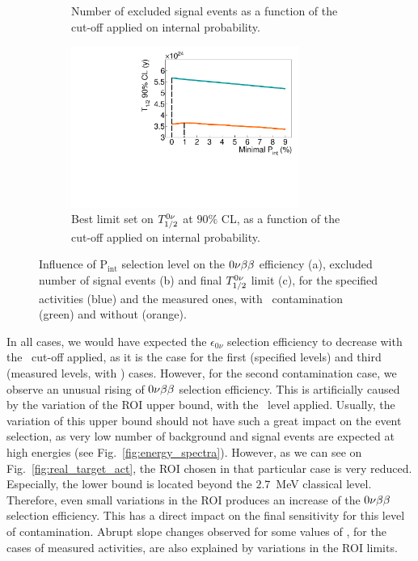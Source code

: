 \begin{figure}[!h]
\begin{subfigure}[t]{0.7\textwidth}
  \caption{Number of excluded signal events as a function of the cut-off applied on internal probability.
    \label{subfig:cont_Pint_Nexp}}
\end{subfigure}
\hfill
\begin{subfigure}[t]{0.7\textwidth}
  \centering
  \includegraphics[width=0.82\textwidth]{Sensitivity/fig_sensitivity/cont_cut_T12_B.pdf}
  \captionsetup{justification=justified}
  \caption{Best limit set on $T_{1/2}^{0\nu}$ at $90\%$ CL, as a function of the cut-off applied on internal probability.
    \label{subfig:cont_Pint_T12}}
\end{subfigure}
\caption{Influence of P$_{\text{int}}$ selection level on the $0\nu\beta\beta$ efficiency (a), excluded number of signal events (b) and final $T_{1/2}^{0\nu}$ limit (c), for the specified activities (blue) and the measured ones, with \Bi\ contamination (green) and without (orange).
    \label{fig:cont_Pint}}
\end{figure}
In all cases, we would have expected the $\epsilon_{0\nu}$ selection efficiency to decrease with the \Pint\ cut-off applied, as it is the case for the first (specified levels) and third (measured levels, with \Bi) cases.
However, for the second contamination case, we observe an unusual rising of $0\nu\beta\beta$ selection efficiency.
This is artificially caused by the variation of the ROI upper bound, with the \Pint\ level applied.
Usually, the variation of this upper bound should not have such a great impact on the event selection, as very low number of background and signal events are expected at high energies (see Fig.~\ref{fig:energy_spectra}).
However, as we can see on Fig.~\ref{fig:real_target_act}, the ROI chosen in that particular case is very reduced.
Especially, the lower bound is located beyond the $2.7$~MeV classical level.
Therefore, even small variations in the ROI produces an increase of the $0\nu\beta\beta$ selection efficiency.
This has a direct impact on the final sensitivity for this level of contamination.
Abrupt slope changes observed for some values of \Pint, for the cases of measured activities, are also explained by variations in the ROI limits.

